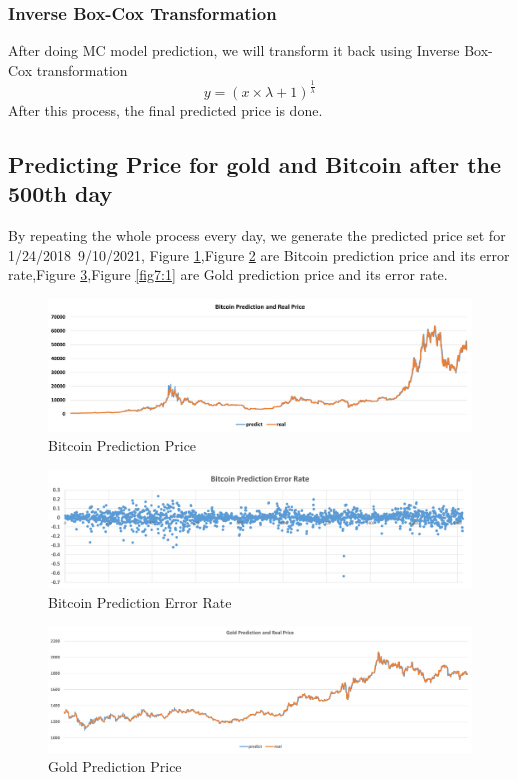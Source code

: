 \documentclass[12pt]{article}
\begin{document}
\subsubsection{Inverse Box-Cox Transformation}
After doing MC model prediction, we will transform it back using Inverse Box-Cox transformation
\begin{equation}
    y=(x\times \lambda+1)^{\frac{1}{\lambda}}
\end{equation}
After this process, the final predicted price is done.
\subsection{Predicting Price for gold and Bitcoin after the 500th day}
By repeating the whole process every day, we generate the predicted price set for 1/24/2018~9/10/2021, Figure \ref{fig8:1},Figure \ref{fig6:1} are Bitcoin prediction price and its error rate,Figure \ref{fig9:1},Figure \ref{fig7:1} are Gold prediction price and its error rate.
\begin{figure}[htp]
    \centering
    \includegraphics[width=0.8\linewidth]{figures/fig11_bitcoin_t.png}  
    \caption{Bitcoin Prediction Price}
    \label{fig8:1}
\end{figure}
\begin{figure}[htp]
    \centering
    \includegraphics[width=0.8\linewidth]{figures/fig9.png}  
    \caption{Bitcoin Prediction Error Rate}
    \label{fig6:1}
\end{figure}
\begin{figure}[htp]
    \centering
    \includegraphics[width=0.8\linewidth]{figures/fig12_gold_t.png}  
    \caption{Gold Prediction Price}
    \label{fig9:1}
\end{figure}
\end{document}
